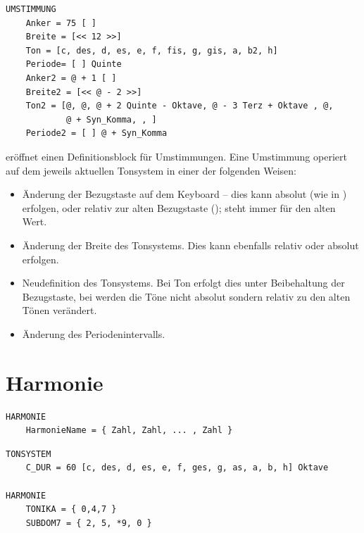 

\begin{verbatim}
UMSTIMMUNG
    Anker = 75 [ ] 
    Breite = [<< 12 >>] 
    Ton = [c, des, d, es, e, f, fis, g, gis, a, b2, h] 
    Periode= [ ] Quinte 
    Anker2 = @ + 1 [ ] 
    Breite2 = [<< @ - 2 >>] 
    Ton2 = [@, @, @ + 2 Quinte - Oktave, @ - 3 Terz + Oktave , @, 
            @ + Syn_Komma, , ] 
    Periode2 = [ ] @ + Syn_Komma
\end{verbatim}



 eröffnet einen Definitionsblock für Umstimmungen. 
Eine Umstimmung operiert auf dem jeweils aktuellen Tonsystem 
in einer der folgenden Weisen:

\begin{itemize}
\item Änderung der Bezugstaste auf dem Keyboard -- dies kann absolut
  (wie in ) erfolgen, oder relativ zur alten
  Bezugstaste (); \keyword{\@} steht immer für den alten Wert.
\item Änderung der Breite des Tonsystems. Dies kann ebenfalls relativ
  oder absolut erfolgen.
\item Neudefinition des Tonsystems. Bei Ton erfolgt dies unter
  Beibehaltung der Bezugstaste, bei  werden die Töne nicht absolut
  sondern relativ zu den alten Tönen verändert.
\item Änderung des Periodenintervalls.
\end{itemize}


\section{Harmonie}
\label{sec:SX_PATTERN}



\begin{verbatim}
HARMONIE
    HarmonieName = { Zahl, Zahl, ... , Zahl }
\end{verbatim}





\begin{verbatim}
TONSYSTEM
    C_DUR = 60 [c, des, d, es, e, f, ges, g, as, a, b, h] Oktave

HARMONIE 
    TONIKA = { 0,4,7 } 
    SUBDOM7 = { 2, 5, *9, 0 }
\end{verbatim}



